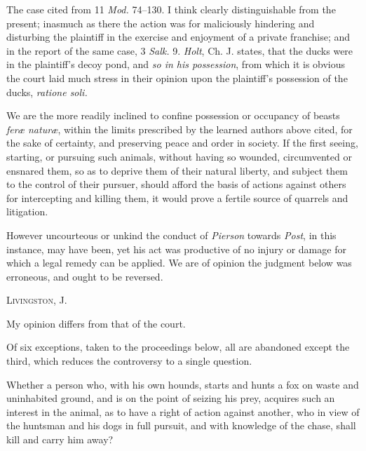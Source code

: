 The case cited from 11 \textit{Mod.} 74--130.
I think clearly distinguishable from the present; inasmuch as there the action
was for maliciously hindering and disturbing the plaintiff in the exercise and
enjoyment of a private franchise; and in the report of the same case, 3
\textit{Salk.} 9. \textit{Holt}, Ch. J. states, that the ducks were in the
plaintiff's decoy pond, and \textit{so in his possession}, from which it is
obvious the court laid much stress in their opinion upon the plaintiff's
possession of the ducks, \textit{ratione soli.}

We are the more readily inclined to confine possession or occupancy of beasts
\textit{fer{\ae} natur{\ae}}, within the limits prescribed by the learned
authors above cited, for the sake of certainty, and preserving peace and order
in society. If the first seeing, starting, or pursuing such animals, without
having so wounded, circumvented or ensnared them, so as to deprive them of their
natural liberty, and subject them to the control of their pursuer, should afford
the basis of actions against others for intercepting and killing them, it would
prove a fertile source of quarrels and litigation.

However uncourteous or unkind the conduct of \textit{Pierson} towards
\textit{Post}, in this instance, may have been, yet his act was productive of no
injury or damage for which a legal remedy can be applied. We are of opinion the
judgment below was erroneous, and ought to be reversed.

\opinion \textsc{Livingston}, J. 

My opinion differs from that of the court.

Of six exceptions, taken to the proceedings below, all are abandoned except the
third, which reduces the controversy to a single question.

Whether a person who, with his own hounds, starts and hunts a fox on waste and
uninhabited ground, and is on the point of seizing his prey, acquires such an
interest in the animal, as to have a right of action against another, who in
view of the huntsman and his dogs in full pursuit, and with knowledge of the
chase, shall kill and carry him away?

